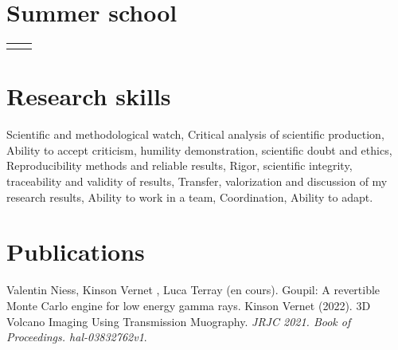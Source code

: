 \documentclass[
	10pt,
]{FreemanCV}
\begin{document}
\begin{paracol}{2}
\section{Summer school}

\begin{supertabular}{r l}
\end{supertabular}


\section{Research skills}

Scientific and methodological watch,
Critical analysis of scientific production,
Ability to accept criticism, humility demonstration, scientific doubt and ethics,
Reproducibility methods and reliable results,
Rigor, scientific integrity, traceability and validity of results,
Transfer, valorization and discussion of my research results,
Ability to work in a team,
Coordination,
Ability to adapt.


\section{Publications}
Valentin Niess, Kinson Vernet , Luca Terray (en cours). Goupil: A revertible Monte Carlo engine for low energy gamma rays.
\medskip
Kinson Vernet (2022). 3D Volcano Imaging Using Transmission Muography. \textit{JRJC 2021. Book of Proceedings. hal-03832762v1}.

\medskip

\end{paracol}
\end{document}
